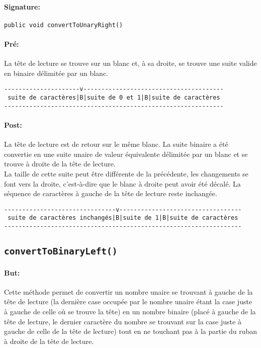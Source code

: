 \documentclass[a4paper,11pt]{article}
\begin{document}
\paragraph{Signature:} \texttt{public void convertToUnaryRight()}
\paragraph{Pré:}
La tête de lecture se trouve sur un blanc et, à sa droite, se trouve une suite valide en binaire délimitée par un blanc.
\begin{verbatim}
---------------------v---------------------------------------
 suite de caractères|B|suite de 0 et 1|B|suite de caractères
-------------------------------------------------------------
\end{verbatim}
\paragraph{Post:}
La tête de lecture est de retour sur le même blanc. La suite binaire a été convertie en une suite unaire de valeur équivalente délimitée par un blanc et se trouve à droite de la tête de lecture.\\
La taille de cette suite peut être différente de la précédente, les changements se font vers la droite, c'est-à-dire que le blanc à droite peut avoir été décalé. La séquence de caractères à gauche de la tête de lecture reste inchangée.
\begin{verbatim}
-------------------------------v----------------------------------
 suite de caractères inchangés|B|suite de 1|B|suite de caractères
------------------------------------------------------------------
\end{verbatim}
\subsection{\texttt{convertToBinaryLeft()}}
\paragraph{But:} Cette méthode permet de convertir un nombre unaire se trouvant à gauche de la tête de lecture (la dernière case occupée par le nombre unaire étant la case juste à gauche de celle où se trouve la tête) en un nombre binaire (placé à gauche de la tête de lecture, le dernier caractère du nombre se trouvant sur la case juste à gauche de celle de la tête de lecture) tout en ne touchant pas à la partie du ruban à droite de la tête de lecture.
\end{document}
